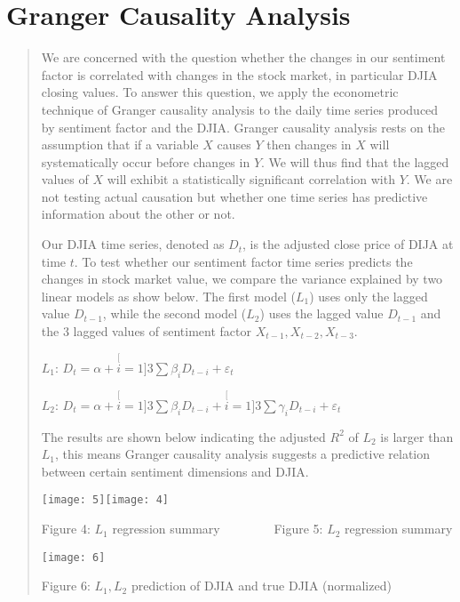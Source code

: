 \documentclass[english]{article}
\begin{document}
\section{Granger Causality Analysis}
\begin{quotation}
We are concerned with the question whether the changes in our sentiment
factor is correlated with changes in the stock market, in particular
DJIA closing values. To answer this question, we apply the econometric
technique of Granger causality analysis to the daily time series produced
by sentiment factor and the DJIA. Granger causality analysis rests
on the assumption that if a variable $X$ causes $Y$ then changes
in $X$ will systematically occur before changes in $Y$. We will
thus find that the lagged values of $X$ will exhibit a statistically
significant correlation with $Y$. We are not testing actual causation
but whether one time series has predictive information about the other
or not. 

Our DJIA time series, denoted as $D_{t}$, is the adjusted close price
of DIJA at time $t$. To test whether our sentiment factor time series
predicts the changes in stock market value, we compare the variance
explained by two linear models as show below. The first model ($L_{1}$)
uses only the lagged value $D_{t-1}$, while the second model ($L_{2}$)
uses the lagged value $D_{t-1}$ and the 3 lagged values of sentiment
factor $X_{t-1},X_{t-2},X_{t-3}$.
\begin{center}
$L_{1}:\,D_{t}=\alpha+\stackrel[i=1]{3}{\sum}\beta_{i}D_{t-i}+\varepsilon_{t}$
\par\end{center}
\begin{center}
$L_{2}:\,D_{t}=\alpha+\stackrel[i=1]{3}{\sum}\beta_{i}D_{t-i}+\stackrel[i=1]{3}{\sum}\gamma_{i}D_{t-i}+\varepsilon_{t\text{}}$
\par\end{center}
The results are shown below indicating the adjusted $R^{2}$ of $L_{2}$
is larger than $L_{1}$, this means Granger causality analysis suggests
a predictive relation between certain sentiment dimensions and DJIA.
\begin{center}
\texttt{[image: 5]}\texttt{[image: 4]}
\par\end{center}
\begin{center}
Figure 4: $L_{1}$ regression summary$\qquad\qquad$ Figure 5: $L_{2}$
regression summary
\par\end{center}
\begin{center}
\texttt{[image: 6]}
\par\end{center}
\begin{center}
Figure 6: $L_{1},L_{2}$ prediction of DJIA and true DJIA (normalized)
\par\end{center}
\end{quotation}
\end{document}
